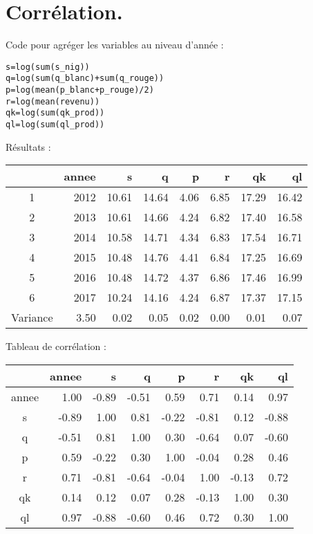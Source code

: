 \documentclass[11pt, a4paper]{article}
\begin{document}
\section*{Corrélation.}
\par
Code pour agréger les variables au niveau d'année :
\begin{alltt}
      s = log(sum(s_nig)) 
      q = log(sum(q_blanc) + sum(q_rouge)) 
      p = log(mean(p_blanc + p_rouge)/2)
      r = log(mean(revenu))
      qk = log(sum(qk_prod))
      ql = log(sum(ql_prod))
\end{alltt}
Résultats :
\FloatBarrier
\begin{center}
\begin{tabular}{c|rrrrrrr}
  \hline
 & annee & s & q & p & r & qk & ql \\ 
  \hline
  1 & 2012 & 10.61 & 14.64 & 4.06 & 6.85 & 17.29 & 16.42 \\ 
  2 & 2013 & 10.61 & 14.66 & 4.24 & 6.82 & 17.40 & 16.58 \\ 
  3 & 2014 & 10.58 & 14.71 & 4.34 & 6.83 & 17.54 & 16.71 \\ 
  4 & 2015 & 10.48 & 14.76 & 4.41 & 6.84 & 17.25 & 16.69 \\ 
  5 & 2016 & 10.48 & 14.72 & 4.37 & 6.86 & 17.46 & 16.99 \\ 
  6 & 2017 & 10.24 & 14.16 & 4.24 & 6.87 & 17.37 & 17.15 \\ 
   \hline
  Variance & 3.50 & 0.02 & 0.05 & 0.02 & 0.00 & 0.01 & 0.07 \\ 
   \hline
\end{tabular}
\end{center}
\FloatBarrier
Tableau de corrélation :
\FloatBarrier
\begin{center}
\begin{tabular}{|c|rrrrrrr}
  \hline
  & annee & s & q & p & r & qk & ql \\ 
  \hline
  annee & 1.00 & -0.89 & -0.51 & 0.59 & 0.71 & 0.14 & 0.97 \\ 
  s & -0.89 & 1.00 & 0.81 & -0.22 & -0.81 & 0.12 & -0.88 \\ 
  q & -0.51 & 0.81 & 1.00 & 0.30 & -0.64 & 0.07 & -0.60 \\ 
  p & 0.59 & -0.22 & 0.30 & 1.00 & -0.04 & 0.28 & 0.46 \\ 
  r & 0.71 & -0.81 & -0.64 & -0.04 & 1.00 & -0.13 & 0.72 \\ 
  qk & 0.14 & 0.12 & 0.07 & 0.28 & -0.13 & 1.00 & 0.30 \\ 
  ql & 0.97 & -0.88 & -0.60 & 0.46 & 0.72 & 0.30 & 1.00 \\ 
   \hline
\end{tabular}
\end{center}
\FloatBarrier
\newpage
\end{document}
